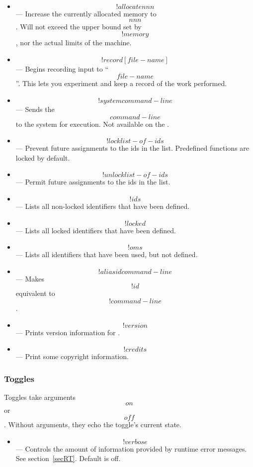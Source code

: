 {\begin{itemize}
\item{}
\[!allocate nnn\] --- Increase the currently allocated memory to \[nnn\].
Will not exceed the upper bound set by \[!memory\],
nor the actual limits of the machine.

\item{}
\[!record [ file-name ] \] ---
Begins recording input to ``\[file-name\]''.
This lets you experiment and keep a record of the work performed.

\item{}
\[!system command-line\] ---
Sends the \[command-line\] to the system for execution.
Not available on the .

\item{}
\[!lock list-of-ids\] --- Prevent future assignments to the ids in the list.
Predefined functions are locked by default.

\item{}
\[!unlock list-of-ids\] --- Permit future assignments to the ids in the list.



\item{}
\[!ids\] --- Lists all non-locked identifiers that have been defined.

\item{}
\[!locked\] --- Lists all locked identifiers that have been defined.

\item{}
\[!oms\] --- Lists all identifiers that have been used,
but not defined.


\item{}
\[!alias id command-line\] --- Makes \[!id\] equivalent to
\[!command-line\]. 

\item{}
\[!version\] --- Prints version information for \ISETL.

\item{}
\[!credits\] --- Print some copyright information.
\end{itemize}

\subsubsection{Toggles}
Toggles take arguments \[on\] or \[off\].
Without arguments, they echo the toggle's current state.
\begin{itemize}

\item{}
\[!verbose\] --- Controls the amount of information provided
by runtime error messages.
See section~\ref{secRT}.
Default is off.


\end{itemize}}
